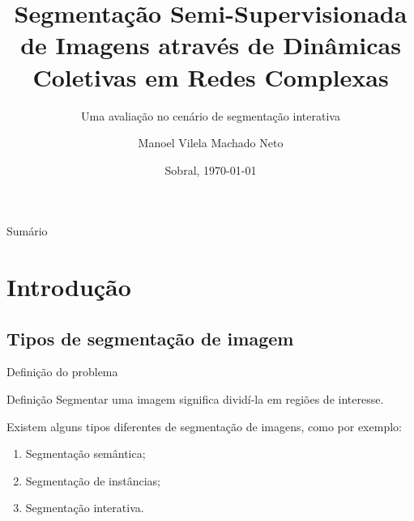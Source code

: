 \documentclass{templatebeamerufc/libs/ufc_format}
\title[EGSIS]{\textbf{Segmentação Semi-Supervisionada de Imagens através de
Dinâmicas Coletivas em Redes Complexas}}
\subtitle{Uma avaliação no cenário de segmentação interativa}
\author{Manoel Vilela Machado Neto}
\institute[UFC]{
    \normalsize{\email{manoel.machado@alu.ufc.br}}
    \newline
    \department{Engenharia da Computação}
    \newline
    \ufc{}
}
\date{Sobral, \today}
\begin{document}

\begin{frame}{}
    \maketitle
\end{frame}

\begin{frame}[allowframebreaks]{Sumário}
  \tableofcontents[sections={1-2}]
    \framebreak{}
  \tableofcontents[sections={3-5}]
\end{frame}

\section{Introdução}

\subsection{Tipos de segmentação de imagem}

\begin{frame}{Definição do problema}
  \begin{block}{Definição}
    Segmentar uma imagem significa dividí-la em regiões de interesse.
  \end{block}

  Existem alguns tipos diferentes de segmentação de imagens, como por
exemplo:
  \begin{enumerate}
    \item Segmentação semântica;
    \item Segmentação de instâncias;
    \item Segmentação interativa.
  \end{enumerate}
\end{frame}
\end{document}
